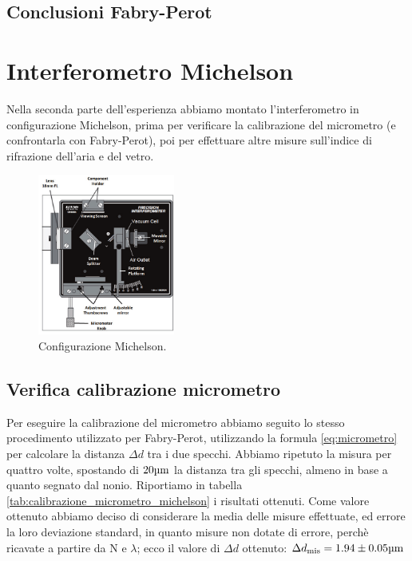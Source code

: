 \documentclass[letterpaper,12pt]{article}
\begin{document}
\subsection{Conclusioni Fabry-Perot}

\newpage
\section{Interferometro Michelson}
Nella seconda parte dell'esperienza abbiamo montato l'interferometro in configurazione Michelson, prima per verificare 
la calibrazione del micrometro (e confrontarla con Fabry-Perot), poi per effettuare altre misure sull'indice di rifrazione
dell'aria e del vetro.
\begin{figure}[h]
    \centering
    \includegraphics[width=0.4\textwidth]{Michelson_aria.png}
    \caption{Configurazione Michelson.}
    \label{fig:michelson config}
\end{figure}

\subsection{Verifica calibrazione micrometro}
Per eseguire la calibrazione del micrometro abbiamo seguito lo stesso procedimento utilizzato per Fabry-Perot, 
utilizzando la formula \ref{eq:micrometro} per calcolare la distanza $\Delta d$ tra i due specchi. Abbiamo ripetuto
la misura per quattro volte, spostando di $20 \text{\SIUnitSymbolMicro m}$ la distanza tra gli specchi, almeno in base a quanto segnato 
dal nonio. Riportiamo in tabella \ref{tab:calibrazione_micrometro_michelson} i risultati ottenuti. Come valore ottenuto
abbiamo deciso di considerare la media delle misure effettuate, ed errore la loro deviazione standard, in quanto 
misure non dotate di errore, perchè ricavate a partire da N e $\lambda$; ecco il valore di $\Delta d$ ottenuto: 
$\Delta d_\text{mis} = 1.94 \pm0.05\text{\SIUnitSymbolMicro m} $
\end{document}
